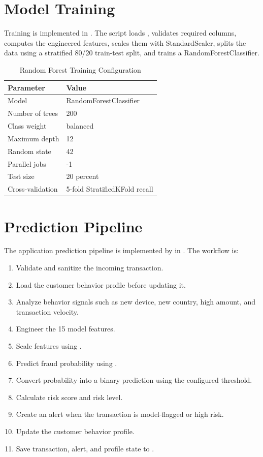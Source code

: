 \documentclass[12pt,a4paper]{report}
\begin{document}
\section{Model Training}
Training is implemented in . The script loads , validates required columns, computes the engineered features, scales them with StandardScaler, splits the data using a stratified 80/20 train-test split, and trains a RandomForestClassifier.

\begin{table}[H]
\centering
\caption{Random Forest Training Configuration}
\begin{tabular}{ll}
\toprule
\textbf{Parameter} & \textbf{Value} \\
\midrule
Model & RandomForestClassifier \\
Number of trees & 200 \\
Class weight & balanced \\
Maximum depth & 12 \\
Random state & 42 \\
Parallel jobs & -1 \\
Test size & 20 percent \\
Cross-validation & 5-fold StratifiedKFold recall \\
\bottomrule
\end{tabular}
\end{table}

\section{Prediction Pipeline}
The application prediction pipeline is implemented by  in . The workflow is:
\begin{enumerate}
    \item Validate and sanitize the incoming transaction.
    \item Load the customer behavior profile before updating it.
    \item Analyze behavior signals such as new device, new country, high amount, and transaction velocity.
    \item Engineer the 15 model features.
    \item Scale features using .
    \item Predict fraud probability using .
    \item Convert probability into a binary prediction using the configured threshold.
    \item Calculate risk score and risk level.
    \item Create an alert when the transaction is model-flagged or high risk.
    \item Update the customer behavior profile.
    \item Save transaction, alert, and profile state to .
\end{enumerate}
\end{document}
